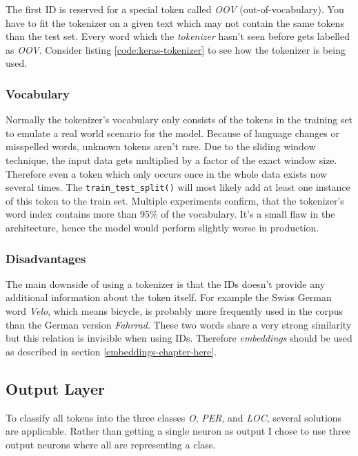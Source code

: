 The first ID is reserved for a special token called \emph{OOV} (out-of-vocabulary). You have to fit the tokenizer on a given text which may not contain the same
tokens than the test set. Every word which the \emph{tokenizer} hasn't seen before gets labelled as \emph{OOV}. Consider listing \ref{code:keras-tokenizer} to see
how the tokenizer is being used.

\subsubsection{Vocabulary}

Normally the tokenizer's vocabulary only consists of the tokens in the training set to emulate a real world scenario for the model. Because of language changes or
misspelled words, unknown tokens aren't rare. Due to the sliding window technique, the input data gets multiplied by a factor of the exact window size. Therefore
even a token which only occurs once in the whole data exists now several times. The \verb|train_test_split()| will most likely add at least one instance of this
token to the train set. Multiple experiments confirm, that the tokenizer's word index contains more than 95\% of the vocabulary. It's a small flaw in the
architecture, hence the model would perform slightly worse in production.

\subsubsection{Disadvantages}

The main downside of using a tokenizer is that the IDs doesn't provide any additional information about the token itself. For example the Swiss German word \emph{Velo},
which means bicycle, is probably more frequently used in the corpus than the German version \emph{Fahrrad}. These two words share a very strong similarity but this
relation is invisible when using IDs. Therefore \emph{embeddings} should be used as described in section \ref{embeddings-chapter-here}.

\subsection{Output Layer}

To classify all tokens into the three classes \emph{O}, \emph{PER}, and \emph{LOC}, several solutions are applicable. Rather than getting a single neuron as output I
chose to use three output neurons where all are representing a class. 

